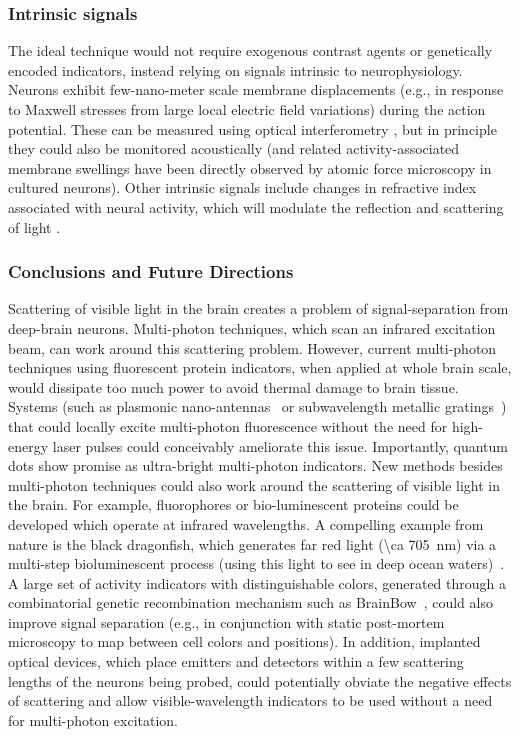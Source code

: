 \subsubsection{Intrinsic signals}

The ideal technique would not require exogenous contrast agents or genetically encoded indicators, instead relying on signals intrinsic to neurophysiology. Neurons exhibit few-nano-meter scale \cite{iwasa1980swelling} membrane displacements (e.g., in response to Maxwell stresses from large local electric field variations) during the action potential. These can be measured using optical interferometry \cite{fang2004noncontact}, but in principle they could also be monitored acoustically (and related activity-associated membrane swellings have been directly observed by atomic force microscopy \cite{kim2007mechanical} in cultured neurons). Other intrinsic signals include changes in refractive index associated with neural activity, which will modulate the reflection and scattering of light \cite{stepnoski1991noninvasive}.

\subsubsection{Conclusions and Future Directions}

Scattering of visible light in the brain creates a problem of signal-separation from deep-brain neurons.
Multi-photon techniques, which scan an infrared excitation beam, can work around this scattering problem.
However, current multi-photon techniques using fluorescent protein indicators, when applied at whole brain scale, would dissipate too much power to avoid thermal damage to brain tissue.
Systems (such as plasmonic nano-antennas~\cite{blanchard11} or subwavelength metallic gratings~\cite{Harats11}) that could locally excite multi-photon fluorescence without the need for high-energy laser pulses could conceivably ameliorate this issue. 
Importantly, quantum dots show promise as ultra-bright multi-photon indicators.
New methods besides multi-photon techniques could also work around the scattering of visible light in the brain.
For example, fluorophores or bio-luminescent proteins could be developed which operate at infrared wavelengths.
A compelling example from nature is the black dragonfish, which generates far red light (\SI{\ca 705}{\nano\meter}) via a multi-step bioluminescent process (using this light to see in deep ocean waters)~\cite{widder84,campbell87}.
A large set of activity indicators with distinguishable colors, generated through a combinatorial genetic recombination mechanism such as BrainBow~\cite{livet07}, could also improve signal separation (e.g., in conjunction with static post-mortem microscopy to map between cell colors and positions).
In addition, implanted optical devices, which place emitters and detectors within a few scattering lengths of the neurons being probed, could potentially obviate the negative effects of scattering and allow visible-wavelength indicators to be used without a need for multi-photon excitation.

